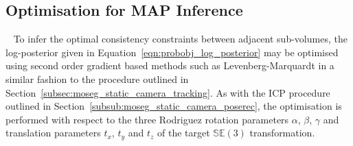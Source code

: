 \subsection{Optimisation for MAP Inference}
~\label{subsec:probobj_map_optimisation}
To infer the optimal consistency constraints between adjacent sub-volumes, the
log-posterior given in Equation~\ref{eqn:probobj_log_posterior} may be optimised
using second order gradient based methods such as Levenberg-Marquardt in a similar 
fashion to the procedure outlined in Section~\ref{subsec:moseg_static_camera_tracking}. 
As with the ICP procedure outlined in Section~\ref{subsub:moseg_static_camera_poserec},
the optimisation is performed with respect to the three Rodriguez rotation
parameters \( \alpha \), \( \beta \), \( \gamma \) and translation parameters \(t_{x}\),
\(t_{y}\) and \(t_{z}\) of the target \(\mathbb{SE}(3)\) transformation.


